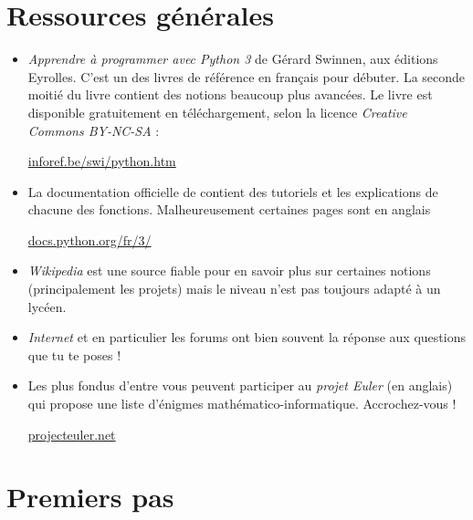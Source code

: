 \documentclass[11pt,class=report,crop=false]{standalone}
\begin{document}


\section*{Ressources générales}

\begin{itemize}
  \item \emph{Apprendre à programmer avec Python 3} de Gérard Swinnen, aux éditions Eyrolles.
   C'est un des livres de référence en français pour débuter. La seconde moitié du livre contient des notions beaucoup plus avancées. 
  Le livre est disponible gratuitement en téléchargement, selon la licence \emph{Creative Commons BY-NC-SA} :\\
  \centerline{
  \href{https://inforef.be/swi/python.htm}{inforef.be/swi/python.htm}
}
  \item La documentation officielle de \Python{} contient des tutoriels et les explications de chacune des fonctions. Malheureusement certaines pages sont en anglais\\
  \centerline{
\href{https://docs.python.org/fr/3/}{docs.python.org/fr/3/}
}  
  \item \emph{Wikipedia} est une source fiable pour en savoir plus sur certaines notions (principalement les projets) mais le niveau n'est pas toujours adapté à un lycéen.
  
  \item \emph{Internet} et en particulier les forums ont bien souvent la réponse aux questions que tu te poses ! 
  
  \item Les plus fondus d'entre vous peuvent participer au \emph{projet Euler} (en anglais) qui propose une liste d'énigmes mathématico-informatique. Accrochez-vous !\\
  \centerline{
  \href{https://projecteuler.net/}{projecteuler.net}
}  
\end{itemize}


\section{Premiers pas}
\end{document}
